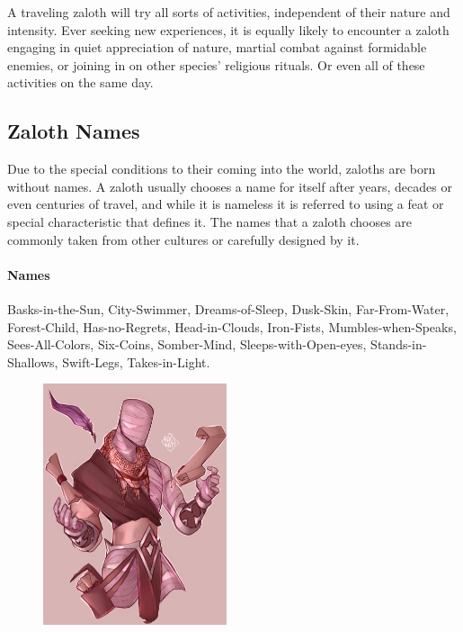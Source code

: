 \begin{linenumbers}
A traveling zaloth will try all sorts of activities, independent of their nature and intensity.
Ever seeking new experiences, it is equally likely to encounter a zaloth engaging in quiet appreciation of nature, martial combat against formidable enemies, or joining in on other species' religious rituals.
Or even all of these activities on the same day.

\subsection*{Zaloth Names}
Due to the special conditions to their coming into the world, zaloths are born without names.
A zaloth usually chooses a name for itself after years, decades or even centuries of travel, and while it is nameless it is referred to using a feat or special characteristic that defines it.
The names that a zaloth chooses are commonly taken from other cultures or carefully designed by it.

\paragraph{Names} Basks-in-the-Sun, City-Swimmer, Dreams-of-Sleep, Dusk-Skin, Far-From-Water, Forest-Child, Has-no-Regrets, Head-in-Clouds, Iron-Fists, Mumbles-when-Speaks, Sees-All-Colors, Six-Coins, Somber-Mind, Sleeps-with-Open-eyes, Stands-in-Shallows, Swift-Legs, Takes-in-Light.

\begin{figure}[!t]
    \centering
    \includegraphics[width=0.48\textwidth]{02kins/img/20zaloth_scholar.png}
\end{figure}


\end{linenumbers}
